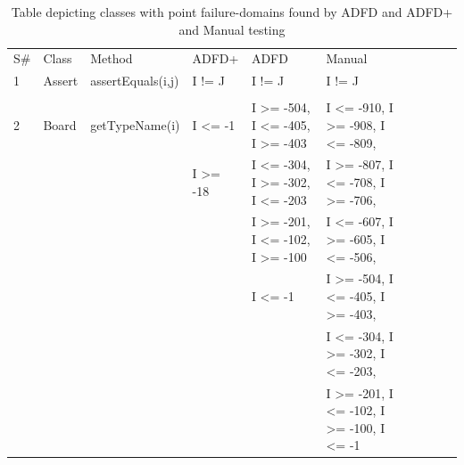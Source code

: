 \documentclass[conference]{IEEEtran}
\begin{document}
\begin{table}[h]
\caption{Table depicting classes with point failure-domains found by ADFD and ADFD+ and Manual testing}
\centering
{\renewcommand{\arraystretch}{1}
\begin{tabular}{llllllllll}

S\# & Class			& Method 					& ADFD+        				& ADFD     								& Manual																						\\ 

1	& Assert			& assertEquals(i,j)		&  	I != J								& I != J															&  I != J																	\\ 
	&                         &                                      & 										& 																&  			   															\\	
2	& Board			& getTypeName(i)		&  	I \textless= -1						& I \textgreater= -504, I \textless= -405, I \textgreater= -403		&  I \textless= -910, I \textgreater= -908, I \textless= -809,    				  \\ 
	&                         &                                      & 	I \textgreater= -18					& I \textless= -304, I \textgreater= -302, I \textless= -203			&  I \textgreater= -807, I \textless= -708, I \textgreater= -706, 				  \\	
	&                         &                                      & 										& I \textgreater= -201, I \textless= -102, I \textgreater= -100		&  I \textless= -607, I \textgreater= -605, I \textless= -506,		 		 \\
	&                         &                                      & 										& I \textless= -1													&  I \textgreater= -504, I \textless= -405, I \textgreater= -403,				  \\
	&                         &                                      & 										& 																&  I \textless= -304, I \textgreater= -302, I \textless= -203,				  \\
	&                         &                                      & 										& 																&  I \textgreater= -201, I \textless= -102, I \textgreater= -100, I \textless= -1 \\
	

\end{tabular}}
\end{table}
\end{document}
